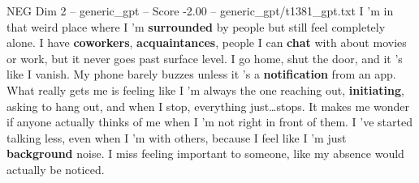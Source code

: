 \begin{textsample}{NEG Dim 2 – generic\_gpt – Score -2.00 – generic\_gpt/t1381\_gpt.txt}  \label{ex:f2_neg_014}
I ’m in that weird place where I ’m \textbf{surrounded} by people but still feel completely alone.
I have \textbf{coworkers}, \textbf{acquaintances}, people I can \textbf{chat} with about movies or work, but it never goes past surface level.
I go home, shut the door, and it ’s like I vanish.
My phone barely buzzes unless it ’s a \textbf{notification} from an app.
What really gets me is feeling like I ’m always the one reaching out, \textbf{initiating}, asking to hang out, and when I stop, everything just…stops.
It makes me wonder if anyone actually thinks of me when I ’m not right in front of them.
I ’ve started talking less, even when I ’m with others, because I feel like I ’m just \textbf{background} noise.
I miss feeling important to someone, like my absence would actually be noticed.

\end{textsample}
